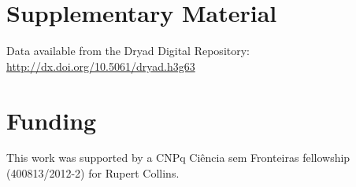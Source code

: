 \documentclass[12pt]{article}
\begin{document}
\section*{Supplementary Material}

Data available from the Dryad Digital Repository: \url{http://dx.doi.org/10.5061/dryad.h3g63}


\section*{Funding}

This work was supported by a CNPq Ci\^encia sem Fronteiras fellowship (400813/2012-2) for Rupert Collins.



\end{document}
